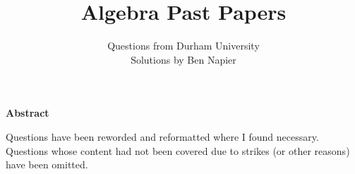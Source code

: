 \documentclass[a4paper, answers]{exam}
\title{Algebra Past Papers}
\author{
    Questions from Durham University \\ 
    Solutions by Ben Napier
}
\begin{document}
    \begin{titlepage}
        \maketitle
    \end{titlepage}

    \tableofcontents
    \clearpage

    \thispagestyle{empty}
    \vspace*{21.5em}
    \begin{center}
        \parbox{0.77\textwidth}{
            \noindent
            \begin{center}
                \normalsize\textbf{Abstract}
            \end{center}
            \vspace{-3pt}
            Questions have been reworded and reformatted where
            I found necessary.
            Questions whose content had not been covered due
            to strikes (or other reasons) have been omitted.
        }
    \end{center}
    \vspace*{\fill}

    \clearpage
    \begin{questions}
        
        
    \end{questions}
\end{document}

